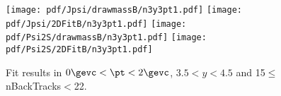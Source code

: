 \begin{figure}[H]
\begin{center}
\texttt{[image: pdf/Jpsi/drawmassB/n3y3pt1.pdf]}
\texttt{[image: pdf/Jpsi/2DFitB/n3y3pt1.pdf]}
\vspace*{-0.5cm}
\texttt{[image: pdf/Psi2S/drawmassB/n3y3pt1.pdf]}
\texttt{[image: pdf/Psi2S/2DFitB/n3y3pt1.pdf]}
\vspace*{-0.5cm}
\end{center}
\caption{Fit results in $0\gevc<\pt<2\gevc$, $3.5<y<4.5$ and 15$\leq$nBackTracks$<$22.}
\label{Fitn3y3pt1}
\end{figure}
